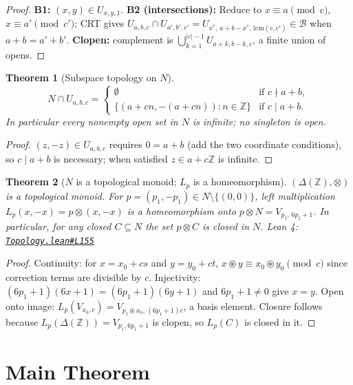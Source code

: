 \documentclass[11pt,a4paper]{amsart}
\theoremstyle{plain}
\newtheorem{theorem}{Theorem}[section]
\theoremstyle{definition}
\theoremstyle{remark}
\newcommand{\mstar}{\mathbin{\circledast}}  %
\newcommand{\tens}{\mathbin{\otimes}}       %
\newcommand{\Z}{\mathbb{Z}}
\newcommand{\Deltaop}{\Delta(\Z)}
\newcommand{\GH}{https://github.com/FruitfulApproach/Lean4TPC/blob/main}
\begin{document}
\begin{proof}
\textbf{B1:} $(x,y) \in U_{x,y,1}$.
\textbf{B2 (intersections):} Reduce to
$x \equiv a \pmod{c}$, $x \equiv a' \pmod{c'}$; CRT gives
$U_{a,b,c} \cap U_{a',b',c'} = U_{x^*,\,a+b-x^*,\,\mathrm{lcm}(c,c')} \in \mathcal{B}$
when $a+b = a'+b'$.
\textbf{Clopen:} complement is
$\bigcup_{k=1}^{|c|-1} U_{a+k,b-k,c}$, a finite union of opens.
\end{proof}

\begin{theorem}[Subspace topology on $N$]
\label{thm:subspace}
\[
N \cap U_{a,b,c} =
\begin{cases}
\emptyset & \text{if } c \nmid a+b, \\
\{(a+cn,-(a+cn)) : n \in \Z\} & \text{if } c \mid a+b.
\end{cases}
\]
In particular every nonempty open set in $N$ is infinite; no singleton is open.
\end{theorem}

\begin{proof}
$(z,-z) \in U_{a,b,c}$ requires $0 = a+b$ (add the two coordinate conditions),
so $c \mid a+b$ is necessary; when satisfied $z \in a+c\Z$ is infinite.
\end{proof}

\begin{theorem}[$N$ is a topological monoid; $L_p$ is a homeomorphism]
\label{thm:topmonoid}
$(\Deltaop, \tens)$ is a topological monoid.  For
$p = (p_1,-p_1) \in N \setminus \{(0,0)\}$, left multiplication
$L_p(x,-x) = p \tens (x,-x)$ is a homeomorphism onto
$p \tens N = V_{p_1,\,6p_1+1}$.  In particular, for any closed
$C \subseteq N$ the set $p \tens C$ is closed in $N$.
\textnormal{Lean 4:} \href{\GH/TPC/Topology.lean\#L155}{\texttt{Topology.lean\#L155}}
\end{theorem}

\begin{proof}
Continuity: for $x = x_0 + cs$ and $y = y_0 + ct$,
$x \mstar y \equiv x_0 \mstar y_0 \pmod{c}$ since correction terms are
divisible by $c$.  Injectivity: $(6p_1+1)(6x+1) = (6p_1+1)(6y+1)$ and
$6p_1+1 \neq 0$ give $x = y$.  Open onto image: $L_p(V_{x_0,c}) =
V_{p_1 \mstar x_0,\,(6p_1+1)c}$, a basis element.  Closure follows because
$L_p(\Deltaop) = V_{p_1,6p_1+1}$ is clopen, so $L_p(C)$ is closed in it.
\end{proof}

\section{Main Theorem}
\end{document}

